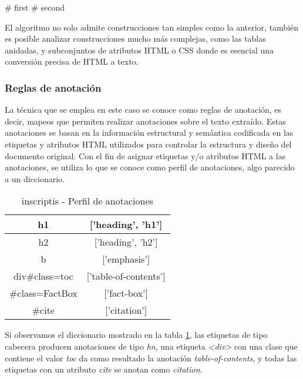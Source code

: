 \begin{Schunk}
  \begin{Soutput}
    # first
    # second
  \end{Soutput}
\end{Schunk}

El algoritmo no solo admite construcciones tan simples como la anterior, también es posible analizar 
construcciones mucho más complejas, como las tablas anidadas, y subconjuntos de atributos HTML o CSS donde 
es esencial una conversión precisa de HTML a texto.

\subsubsection{Reglas de anotación}
\label{subsubsec:reglas de anotacion}

La técnica que se emplea en este caso se conoce como reglas de anotación, es decir, mapeos que permiten 
realizar anotaciones sobre el texto extraído. Estas anotaciones se basan en la información estructural y 
semántica codificada en las etiquetas y atributos HTML utilizados para controlar la estructura y diseño 
del documento original. Con el fin de asignar etiquetas y/o atributos HTML a las anotaciones, se utiliza 
lo que se conoce como perfil de anotaciones, algo parecido a un diccionario. 


\begin{table}[h]
  \begin{center}
  \begin{tabular}{| c | c |} \hline 
    h1 & ['heading', 'h1'] \\ \hline
    h2 & ['heading', 'h2'] \\ \hline
    b & ['emphasis'] \\ \hline
    div\#class=toc & ['table-of-contents'] \\ \hline
    \#class=FactBox & ['fact-box'] \\ \hline
    \#cite & ['citation'] \\ \hline
  \end{tabular}
  \caption{inscriptis - Perfil de anotaciones}
  \label{tab:inscriptis - perfil de anotaciones}
  \end{center}
\end{table}

Si observamos el diccionario mostrado en la tabla \ref{tab:inscriptis - perfil de anotaciones}, las 
etiquetas de tipo cabecera producen anotaciones de tipo \emph{hn}, una etiqueta \emph{<div>} con una 
clase que contiene el valor \emph{toc} da como resultado la anotación \emph{table-of-contents}, y todas 
las etiquetas con un atributo \emph{cite} se anotan como \emph{citation}.

